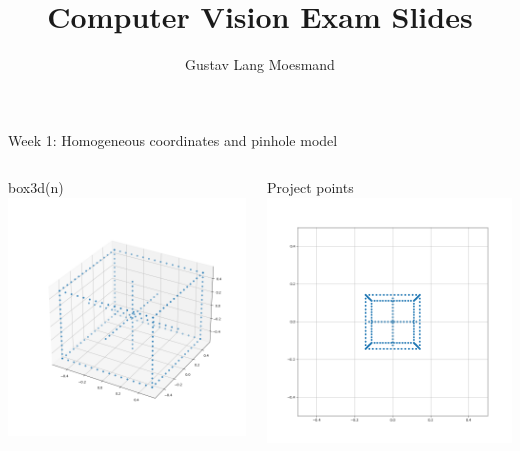 \documentclass[aspectratio=169,hyperref={pdfpagelabels=false}]{beamer}
\subtitle{Gustav Lang Moesmand}
\title{Computer Vision Exam Slides}
\begin{document}
\inserttitlepage

\begin{frame}{ Week 1: Homogeneous coordinates and pinhole model }
\begin{columns}
	\begin{column}{.3\textwidth}
		\begin{block}{box3d(n)}
			\includegraphics[width=\textwidth]{exercise_imgs/ex1-11.png}
		\end{block}					
	\end{column}	
	\begin{column}{.3\textwidth}
		\begin{block}{Project points}
			\includegraphics[width=\textwidth]{exercise_imgs/ex1-12.png}

\end{block}
\end{column}
\end{columns}
\end{frame}
\end{document}
